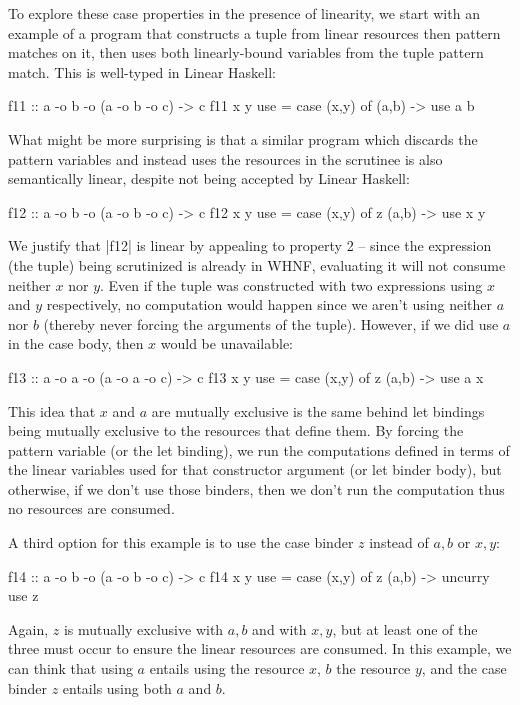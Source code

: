 \documentclass[acmsmall, screen, review]{acmart}
\newcommand{\parawith}[1]{\paragraph{\emph{#1}}}
\begin{document}

To explore these case properties in the presence of linearity, we start with an
example of a program that constructs a tuple from linear resources then pattern
matches on it, then uses both linearly-bound variables from the tuple pattern
match. This is well-typed in Linear Haskell:
\begin{working}
\begin{code}
f11 :: a -o b -o (a -o b -o c) -> c
f11 x y use = case (x,y) of { (a,b) -> use a b }
\end{code}
\end{working}
What might be more surprising is that a similar program which discards the
pattern variables and instead uses the resources in the scrutinee is also
semantically linear, despite not being accepted by Linear Haskell:
\begin{notyet}
\begin{code}
f12 :: a -o b -o (a -o b -o c) -> c
f12 x y use = case (x,y) of z { (a,b) -> use x y }
\end{code}
\end{notyet}
We justify that |f12| is linear by appealing to property 2 -- since the
expression (the tuple) being scrutinized is already in WHNF, evaluating it will
not consume neither $x$ nor $y$. Even if the tuple was constructed with
two expressions using $x$ and $y$ respectively, no computation would happen
since we aren't using neither $a$ nor $b$ (thereby never forcing the arguments
of the tuple). However, if we did use $a$ in the case body, then $x$ would be unavailable:
\begin{noway}
\begin{code}
f13 :: a -o a -o (a -o a -o c) -> c
f13 x y use = case (x,y) of z { (a,b) -> use a x }
\end{code}
\end{noway}
This idea that $x$ and $a$ are mutually exclusive is the same behind let
bindings being mutually exclusive to the resources that define them.
By forcing the pattern variable (or the let binding), we run the computations
defined in terms of the linear variables used for that constructor argument (or
let binder body), but otherwise, if we don't use those binders, then we don't
run the computation thus no resources are consumed.

A third option for this example is to use the case binder $z$ instead of $a,b$ or $x,y$:
\begin{notyet}
\begin{code}
f14 :: a -o b -o (a -o b -o c) -> c
f14 x y use = case (x,y) of z { (a,b) -> uncurry use z }
\end{code}
\end{notyet}
Again, $z$ is mutually exclusive with $a,b$ and with $x,y$, but at least one of
the three must occur to ensure the linear resources are consumed. In this
example, we can think that using $a$ entails using the resource $x$, $b$ the
resource $y$, and the case binder $z$ entails using both $a$ and $b$.
\end{document}
